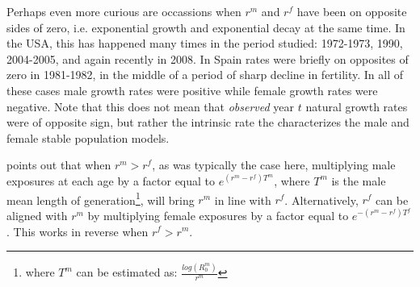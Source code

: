 Perhaps even more curious are occassions when $r^m$ and $r^f$ have been on
opposite sides of zero, i.e. exponential growth and exponential decay at the
same time. In the USA, this has happened many times in the period studied:
1972-1973, 1990, 2004-2005, and again recently in 2008. In Spain rates were 
briefly on opposites of zero in 1981-1982, in the middle of a period of sharp
decline in fertility. In all of these cases male growth rates were positive
while female growth rates were negative. Note that this does not mean that 
\textit{observed} year $t$ natural growth rates were of opposite sign, but
rather the intrinsic rate the characterizes the male and female stable
population models.

\citet[p. 57]{coale1972growth} points out that when $r^m > r^f$, as was
typically the case here, multiplying male exposures at each age by a factor equal to
$e^{(r^m - r^f)T^m}$, where $T^m$ is the male mean length of
generation\footnote{where $T^m$ can be estimated as:
$\frac{log(R_0^m)}{r^m}$}, will bring $r^m$ in line with $r^f$. Alternatively,
$r^f$ can be aligned with $r^m$ by multiplying female exposures by a factor equal
 to $e^{-(r^m - r^f)T^f}$. This works in reverse when $r^f > r^m$.










